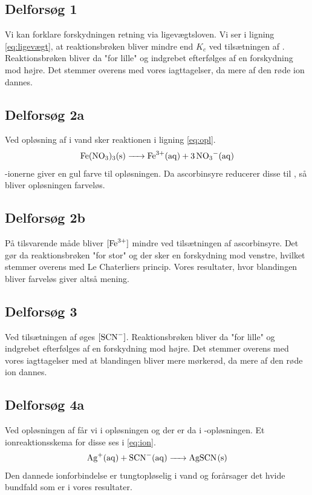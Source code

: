 \documentclass{report}
\begin{document}
\subsection*{Delforsøg 1}
Vi kan forklare forskydningen retning via ligevægtsloven.
Vi ser i ligning \ref{eq:ligevægt}, at reaktionsbrøken bliver mindre end $K_c$ ved tilsætningen af .
Reaktionsbrøken bliver da "for lille" og indgrebet efterfølges af en forskydning mod højre.
Det stemmer overens med vores iagttagelser, da mere af den røde ion dannes.
\subsection*{Delforsøg 2a}
Ved opløsning af  i vand sker reaktionen i ligning \ref{eq:opl}.
\begin{equation}
\label{eq:opl}
\begin{split}
  \ce{Fe(NO3)3(s) -> Fe^3+(aq) + 3NO3-(aq)} 
\end{split}
\end{equation}
-ionerne giver en gul farve til opløsningen.
Da ascorbinsyre reducerer disse til , så bliver opløsningen farveløs.
\subsection*{Delforsøg 2b}
På tilsvarende måde bliver $[\ce{Fe^3+}]$ mindre ved tilsætningen af ascorbinsyre.
Det gør da reaktionsbrøken "for stor" og der sker en forskydning mod venstre, hvilket stemmer overens med Le Chaterliers princip.
Vores resultater, hvor blandingen bliver farveløs giver altså mening.
\subsection*{Delforsøg 3}
Ved tilsætningen af  øges $[\ce{SCN-}]$.
Reaktionsbrøken bliver da "for lille" og indgrebet efterfølges af en forskydning mod højre.
Det stemmer overens med vores iagttagelser med at blandingen bliver mere mørkerød, da mere af den røde ion dannes.
\subsection*{Delforsøg 4a}
Ved opløsningen af  får vi  i opløsningen og der er da  i -opløsningen.
Et ionreaktionsskema for disse ses i \ref{eq:ion}.
\begin{equation}
\label{eq:ion}
\begin{split}
  \ce{Ag+(aq) + SCN-(aq) -> AgSCN(s)} 
\end{split}
\end{equation}
Den dannede ionforbindelse er tungtopløselig i vand og forårsager det hvide bundfald som er i vores resultater.
\end{document}
